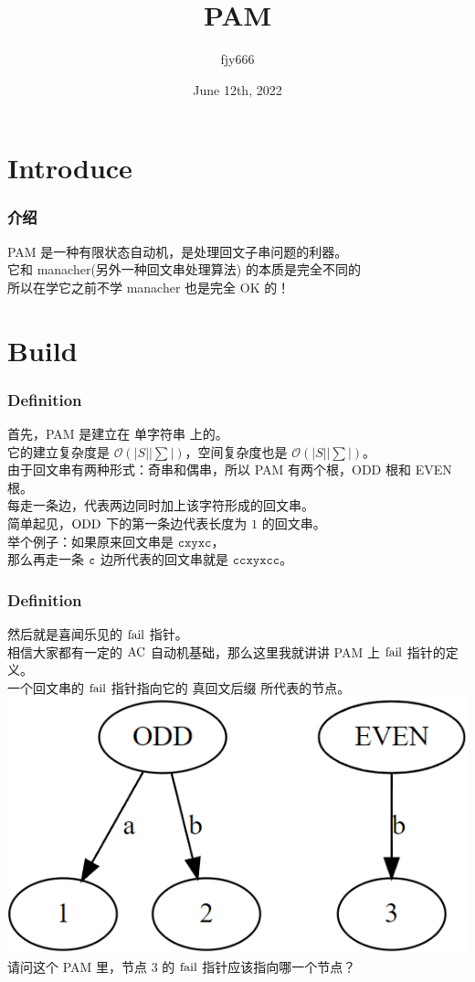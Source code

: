 \documentclass{beamer}
\title{PAM}
\author{fjy666}
\date{June 12th, 2022}
\begin{document}
\begin{CJK}{UTF8}{gbsn}
    \frame{\titlepage}
    \section{Introduce} %
	
    \begin{frame}
        \frametitle{介绍}
		PAM 是一种有限状态自动机，是处理回文子串问题的利器。\\
		它和 manacher(另外一种回文串处理算法) 的本质是完全不同的\\
		所以在学它之前不学 manacher 也是完全 OK 的！
    \end{frame}
	
	\section{Build}
    \begin{frame}
        \frametitle{Definition}
		首先，PAM 是建立在 单字符串 上的。 \\ 
		它的建立复杂度是 $\mathcal{O}(|S||\sum|)$，空间复杂度也是 $\mathcal{O}(|S||\sum|)$。\\
		\pause
		由于回文串有两种形式：奇串和偶串，所以 PAM 有两个根，ODD 根和 EVEN 根。\\
		每走一条边，代表两边同时加上该字符形成的回文串。\\
		简单起见，$\rm ODD$ 下的第一条边代表长度为 $1$ 的回文串。\\
		\pause
		举个例子：如果原来回文串是 $\texttt{cxyxc}$，\\
		\pause
		那么再走一条 $\tt c$ 边所代表的回文串就是 $\texttt{ccxyxcc}$。 
    \end{frame}
	
    \begin{frame}
        \frametitle{Definition}
		然后就是喜闻乐见的 $\rm fail$ 指针。\\  
		相信大家都有一定的 $\rm AC$ 自动机基础，那么这里我就讲讲 PAM 上 $\rm fail$ 指针的定义。\\
		一个回文串的 $\rm fail$ 指针指向它的 $\textbf{真回文后缀}$ 所代表的节点。  
		\includegraphics{1.PNG}\\
		请问这个 PAM 里，节点 $3$ 的 $\rm fail$ 指针应该指向哪一个节点？
    \end{frame}
	

\end{CJK}
\end{document}
